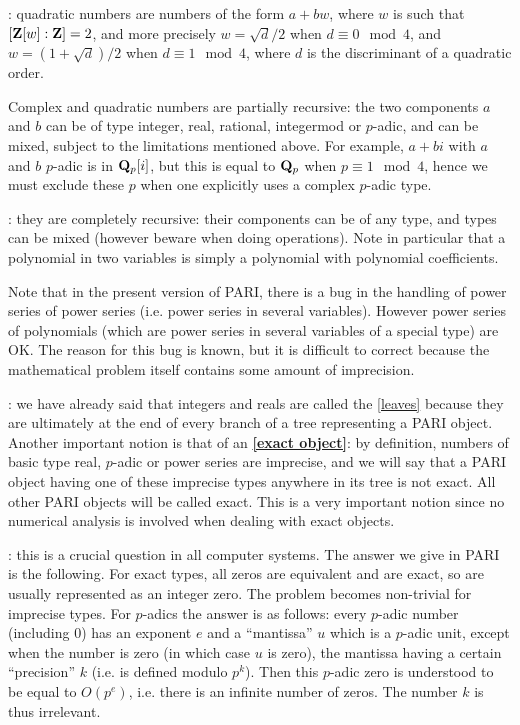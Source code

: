 : 
quadratic numbers are numbers of the form $a+bw$,
where $w$ is such that $[\Bbb Z[w]:\Bbb Z]=2$, and more precisely $w=\sqrt
d/2$ when
$d\equiv 0 \mod 4$, and $w=(1+\sqrt d)/2$ when $d\equiv 1 \mod 4$, where $d$
is
the discriminant of a quadratic order.

 Complex and quadratic numbers are partially recursive: the two components
$a$ and $b$ can be of type integer, real, rational, integermod or $p$-adic,
and can
be mixed, subject to the limitations mentioned above. For example,
$a+bi$ with $a$ and $b$ $p$-adic is in $\Bbb Q_p[i]$, but this is equal to
$\Bbb Q_p$
when $p\equiv 1 \mod 4$, hence we must exclude these $p$ when one explicitly
uses
a complex $p$-adic type.

: 
they are completely recursive:
their components can be of any type, and types can be mixed
(however beware when doing operations). Note in particular that a polynomial
in two variables is simply a polynomial with polynomial coefficients.

Note that in the present version \vers{} of PARI, there is a bug in the handling
of power series of power series (i.e. power series in several variables).
However power series of polynomials (which are power series in several
variables of a special type) are OK. The reason for this bug is known,
but it is difficult to correct because the mathematical problem itself
contains some amount of imprecision.

: we have already
said that integers and reals are called the \ref{leaves} because they are
ultimately
at the end of every branch of a tree representing a PARI object. Another
important notion is that of an {\bf \ref{exact object}}: by definition,
numbers of basic type real, $p$-adic or power series are imprecise, and we
will
say that a PARI object having one of these imprecise types anywhere in its
tree
is not exact. All other PARI objects will be called exact. This is a very
important notion since no numerical analysis is involved when dealing with
exact objects.

: this is a crucial question in all computer
systems. The answer we give in PARI is the following. For exact types,
all zeros are equivalent and are exact, so are usually represented as
an integer zero. The problem becomes
non-trivial for imprecise types. For $p$-adics the answer is as
follows: every $p$-adic number (including 0) has an exponent $e$ and a
``mantissa'' $u$ which is a $p$-adic unit, except when the number is zero (in
which case $u$ is zero), the mantissa having a certain ``precision'' $k$ (i.e.
is defined modulo $p^k$). Then this $p$-adic zero is understood to be
equal to $O(p^e)$, i.e. there is an infinite number of zeros. The number $k$
is thus irrelevant.

